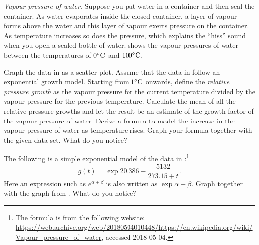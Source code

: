 \documentclass[a4paper,oneside,12pt]{article}
\begin{document}
\begin{problem}
\item\emph{Vapour pressure of water.}
  Suppose you put water in a container and then seal the container.
  As water evaporates inside the closed container, a layer of vapour
  forms above the water and this layer of vapour exerts pressure on
  the container.  As temperature increases so does the pressure, which
  explains the ``hiss'' sound when you open a sealed bottle of water.
   shows the vapour pressures of
  water between the temperatures of ${0}^{\circ}\textrm{C}$ and
  ${100}^{\circ}\textrm{C}$.
  \begin{packedenum}
  \item\label{subprob:water_mean_growth_factor}
    Graph the data in  as a scatter
    plot.  Assume that the data in 
    follow an exponential growth model.  Starting from ${1}^{\circ}\textrm{C}$
    onwards, define the \emph{relative pressure growth} as the vapour
    pressure for the current temperature divided by the vapour
    pressure for the previous temperature.  Calculate the mean of all
    the relative pressure growths and let the result be an estimate of
    the growth factor of the vapour pressure of water.  Derive a
    formula to model the increase in the vapour pressure of water as
    temperature rises.  Graph your formula together with the given
    data set.  What do you notice?

  \item\label{subprob:water_Wikipedia_formula}
    The following is a simple exponential model of the data in
    :\footnote{
      The formula is from the following website:
      \url{https://web.archive.org/web/20180504010448/https://en.wikipedia.org/wiki/Vapour_pressure_of_water},
      accessed 2018-05-04.
    }
    \begin{equation}
    \label{eqn:vapour_pressure_Wikipedia_formula}
    g(t)
    =
    \exp{
      20.386
      -
      \frac{5132}{273.15 + t}
    }.
    \end{equation}
    Here an expression such as $e^{\alpha + \beta}$ is also written as
    $\exp{\alpha + \beta}$.  Graph
     together with the
    graph from .  What do you
    notice?


\end{packedenum}
\end{problem}
\end{document}
